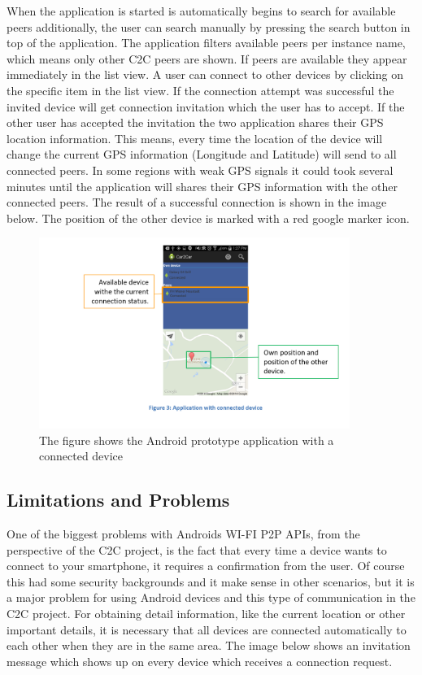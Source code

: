 When the application is started is automatically begins to search for available peers additionally, the user can search manually by pressing the search button in top of the application. The application filters available peers per instance name, which means only other C2C peers are shown. If peers are available they appear immediately in the list view. A user can connect to other devices by clicking on the specific item in the list view. If the connection attempt was successful the invited device will get connection invitation which the user has to accept.  If the other user has accepted the invitation the two application shares their GPS location information. This means, every time the location of the device will change the current GPS information (Longitude and Latitude) will send to all connected peers. In some regions with weak GPS signals it could took several minutes until the application will shares their GPS information with the other connected peers. The result of a successful connection is shown in the image below. The position of the other device is marked with a red google marker icon.


\begin{figure}[ht]
	\centering
  \includegraphics[width=0.9\textwidth]{images/androidScreen2.png}
	\caption{The figure shows the Android prototype application with a connected device}
	\label{fig1}
\end{figure}

\subsection*{Limitations and Problems}
\label{subsec:LimitationsProblems}
One of the biggest problems with Androids WI-FI P2P APIs, from the perspective of the C2C project, is the fact that every time a device wants to connect to your smartphone, it requires a confirmation from the user. Of course this had some security backgrounds and it make sense in other scenarios, but it is a major problem for using Android devices and this type of communication in the C2C project.  For obtaining detail information, like the current location or other important details, it is necessary that all devices are connected automatically to each other when they are in the same area. The image below shows an invitation message which shows up on every device which receives a connection request.
 
